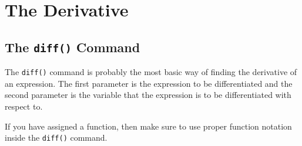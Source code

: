 \chapter{The Derivative}
\label{chp:derivative}			

\section{The \texttt{diff()} Command}

The \texttt{diff()} command is probably the most basic way of finding the derivative of an expression. The first parameter is the expression to be differentiated and the second parameter is the variable that the expression is to be differentiated with respect to.
\begin{maplegroup}
\begin{mapleinput}
\end{mapleinput}
\mapleresult
\begin{maplelatex}
\end{maplelatex}
\end{maplegroup}

If you have assigned a function, then make sure to use proper function notation inside the \texttt{diff()} command.

\begin{maplegroup}
\begin{mapleinput}
\end{mapleinput}
\mapleresult
\begin{maplelatex}
\end{maplelatex}
\end{maplegroup}

\begin{maplegroup}
\begin{mapleinput}
\end{mapleinput}
\mapleresult
\begin{maplelatex}
\end{maplelatex}
\end{maplegroup}

